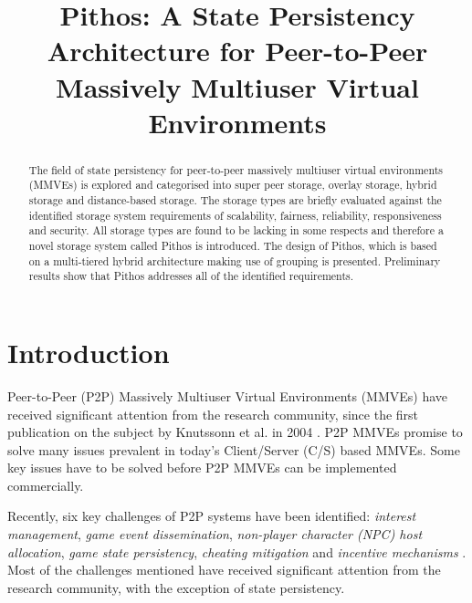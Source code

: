 \documentclass[10pt,a4paper,conference]{IEEEtran}
\begin{document}
%
\title{Pithos: A State Persistency Architecture for Peer-to-Peer Massively Multiuser Virtual Environments}


\maketitle

\begin{abstract}
The field of state persistency for peer-to-peer massively multiuser virtual environments (MMVEs) is explored and categorised into super peer storage,
overlay storage, hybrid storage and distance-based storage. The storage types are briefly evaluated against the identified storage system
requirements of scalability, fairness, reliability, responsiveness and security. All storage types are found to be lacking in some respects and
therefore a novel storage system called Pithos is introduced. The design of Pithos, which is based on a multi-tiered hybrid architecture making use
of grouping is presented. Preliminary results show that Pithos addresses all of the identified requirements.
\end{abstract}


\section{Introduction}
\label{introduction}

Peer-to-Peer (P2P) Massively Multiuser Virtual Environments (MMVEs) have received significant attention from the research community, since the first
publication on the subject by Knutssonn et al. in 2004 \cite{knutsson_p2p_first}. P2P MMVEs promise to solve many issues prevalent in today's
Client/Server (C/S) based MMVEs. Some key issues have to be solved before P2P MMVEs can be implemented commercially.

Recently, six key challenges of P2P systems have been identified: \emph{interest management}, \emph{game event dissemination}, \emph{non-player
character (NPC) host allocation}, \emph{game state persistency}, \emph{cheating mitigation} and \emph{incentive mechanisms}
\cite{Fan_deisgn_issues_p2p}. Most of the challenges mentioned have received significant attention from the research community, with the exception of
state persistency.
\end{document}
